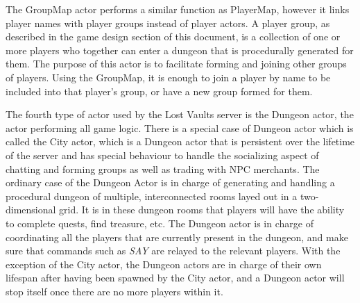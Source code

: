 \documentclass[a4paper]{article}
\begin{document}
The GroupMap actor performs a similar function as PlayerMap, however it links player names with player groups instead of player actors. A player group, as described in the game design 
section of this document, is a collection of one or more players who together can enter a dungeon that is procedurally generated for them. The purpose of this actor is to facilitate 
forming and joining other groups of players. Using the GroupMap, it is enough to join a player by name to be included into that player's group, or have a new group formed for them.

The fourth type of actor used by the Lost Vaults server is the Dungeon actor, the actor performing all game logic. There is a special case of Dungeon actor which is called the City actor, 
which is a Dungeon actor that is persistent over the lifetime of the server and has special behaviour to handle the socializing aspect of chatting and forming groups as well as trading 
with NPC merchants. The ordinary case of the Dungeon Actor is in charge of generating and handling a procedural dungeon of multiple, interconnected rooms layed out in a two-dimensional 
grid. It is in these dungeon rooms that players will have the ability to complete quests, find treasure, etc. The Dungeon actor is in charge of coordinating all the players that are 
currently present in the dungeon, and make sure that commands such as \textit{SAY} are relayed to the relevant players. With the exception of the City actor, the Dungeon actors are 
in charge of their own lifespan after having been spawned by the City actor, and a Dungeon actor will stop itself once there are no more players within it.
\end{document}
